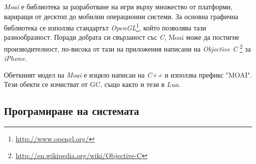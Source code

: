 			\emph{Moai} е библиотека за разработване на игри върху множество от платформи, вариращи от десктоп до
			мобилни операционни системи. За основна графична библиотека се използва стандартът 
			\emph{OpenGL}\footnote{\url{http://www.opengl.org/}}, който позволява тази разнообразност.
			Поради добрата си свързаност със \emph{C}, Moai може да постигне производителност, по-висока
			от тази на приложения написани на  \emph{Objective C}
			\footnote{\url{http://en.wikipedia.org/wiki/Objective-C}} за \emph{iPhone}.

			Обеткният модел на \emph{Moai} е изцяло написан на \emph{C++} и използва префикс "MOAI". Тези обекти
			се изчистват от \ac{GC}, също както и тези в \emph{Lua}.
			
	\subsection{Програмиране на системата}